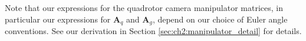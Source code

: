 Note that our expressions for the quadrotor camera manipulator matrices, in particular our expressions for $\mathbf{A}_q$ and $\mathbf{A}_g$, depend on our choice of Euler angle conventions.
See our derivation in Section \ref{sec:ch2:manipulator_detail} for details.

